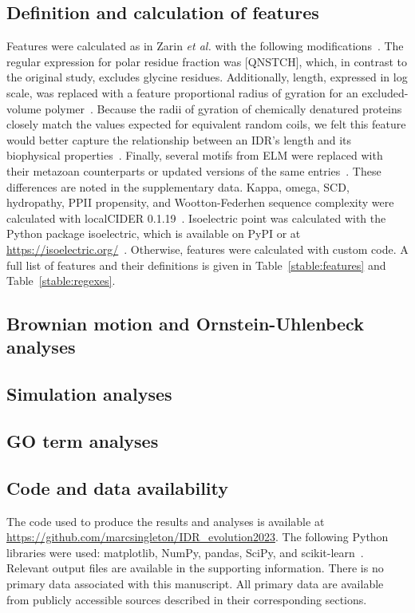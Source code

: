 \subsection{Definition and calculation of features}
Features were calculated as in Zarin \textit{et al.} with the following modifications~\cite{Zarin2019}. The regular expression for polar residue fraction was [QNSTCH], which, in contrast to the original study, excludes glycine residues. Additionally, length, expressed in log scale, was replaced with a feature proportional radius of gyration for an excluded-volume polymer~\cite{Flory1949}. Because the radii of gyration of chemically denatured proteins closely match the values expected for equivalent random coils, we felt this feature would better capture the relationship between an IDR's length and its biophysical properties~\cite{Kohn2004}. Finally, several motifs from ELM were replaced with their metazoan counterparts or updated versions of the same entries~\cite{Kumar2021}. These differences are noted in the supplementary data. Kappa, omega, SCD, hydropathy, PPII propensity, and Wootton-Federhen sequence complexity were calculated with localCIDER 0.1.19~\cite{Holehouse2017}. Isoelectric point was calculated with the Python package isoelectric, which is available on PyPI or at \url{https://isoelectric.org/}~\cite{Kozlowski2016}. Otherwise, features were calculated with custom code. A full list of features and their definitions is given in Table~\ref{stable:features} and Table~\ref{stable:regexes}.

\subsection{Brownian motion and Ornstein-Uhlenbeck analyses}

\subsection{Simulation analyses}

\subsection{GO term analyses}

\subsection{Code and data availability}
The code used to produce the results and analyses is available at \url{https://github.com/marcsingleton/IDR_evolution2023}. The following Python libraries were used: matplotlib, NumPy, pandas, SciPy, and scikit-learn~\cite{Hunter2007, Harris2020, McKinney2010, Virtanen2020, Pedregosa2011}. Relevant output files are available in the supporting information. There is no primary data associated with this manuscript. All primary data are available from publicly accessible sources described in their corresponding sections.